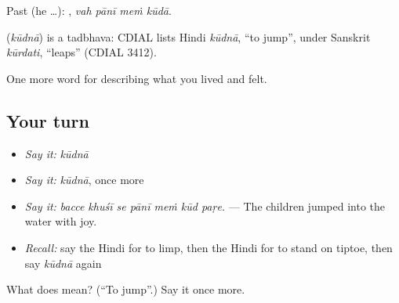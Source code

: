 Past (he …):    , \emph{vah pānī meṁ kūdā}.

\begin{cousinweb}
\textbf{} (\emph{kūdnā}) is a tadbhava: CDIAL lists Hindi \emph{kūdnā}, \textquotedblleft{}to jump\textquotedblright{}, under Sanskrit \emph{kūrdati}, \textquotedblleft{}leaps\textquotedblright{} (CDIAL 3412).
\end{cousinweb}

\begin{grammarlens}[title={What you've built}]
One more word for describing what you lived and felt.
\end{grammarlens}

\subsection*{Your turn}
\begin{itemize}
\raggedright
  \item \emph{Say it:} \emph{kūdnā}
  \item \emph{Say it:} \emph{kūdnā}, once more
  \item \emph{Say it:} \emph{bacce khuśī se pānī meṁ kūd paṛe.} — The children jumped into the water with joy.
  \item \emph{Recall:} say the Hindi for to limp, then the Hindi for to stand on tiptoe, then say \emph{kūdnā} again
\end{itemize}

\begin{tcolorbox}[breakable,colback=teal!4,colframe=teal!35!black,title={Before you move on}]
What does  mean? (\textquotedblleft{}To jump\textquotedblright{}.) Say it once more.
\end{tcolorbox}

